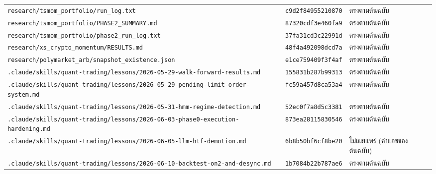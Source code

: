 {\begin{longtable}{@{}>{\raggedright\arraybackslash}p{8.6cm}p{2.7cm}>{\raggedright\arraybackslash}p{3.4cm}@{}}
\texttt{research/\allowbreak{}tsmom\_portfolio/\allowbreak{}run\_log.txt} & \texttt{c9d2f84955210870} & ตรงตามต้นฉบับ \\
\texttt{research/\allowbreak{}tsmom\_portfolio/\allowbreak{}PHASE2\_SUMMARY.md} & \texttt{87320cdf3e460fa9} & ตรงตามต้นฉบับ \\
\texttt{research/\allowbreak{}tsmom\_portfolio/\allowbreak{}phase2\_run\_log.txt} & \texttt{37fa31cd3c22991d} & ตรงตามต้นฉบับ \\
\texttt{research/\allowbreak{}xs\_crypto\_momentum/\allowbreak{}RESULTS.md} & \texttt{48f4a492098dcd7a} & ตรงตามต้นฉบับ \\
\texttt{research/\allowbreak{}polymarket\_arb/\allowbreak{}snapshot\_existence.json} & \texttt{e1ce759409f3f4af} & ตรงตามต้นฉบับ \\
\texttt{.claude/\allowbreak{}skills/\allowbreak{}quant-\allowbreak{}trading/\allowbreak{}lessons/\allowbreak{}2026-\allowbreak{}05-\allowbreak{}29-\allowbreak{}walk-\allowbreak{}forward-\allowbreak{}results.md} & \texttt{155831b287b99313} & ตรงตามต้นฉบับ \\
\texttt{.claude/\allowbreak{}skills/\allowbreak{}quant-\allowbreak{}trading/\allowbreak{}lessons/\allowbreak{}2026-\allowbreak{}05-\allowbreak{}29-\allowbreak{}pending-\allowbreak{}limit-\allowbreak{}order-\allowbreak{}system.md} & \texttt{fc59a457d8ca53a4} & ตรงตามต้นฉบับ \\
\texttt{.claude/\allowbreak{}skills/\allowbreak{}quant-\allowbreak{}trading/\allowbreak{}lessons/\allowbreak{}2026-\allowbreak{}05-\allowbreak{}31-\allowbreak{}hmm-\allowbreak{}regime-\allowbreak{}detection.md} & \texttt{52ec0f7a8d5c3381} & ตรงตามต้นฉบับ \\
\texttt{.claude/\allowbreak{}skills/\allowbreak{}quant-\allowbreak{}trading/\allowbreak{}lessons/\allowbreak{}2026-\allowbreak{}06-\allowbreak{}03-\allowbreak{}phase0-\allowbreak{}execution-\allowbreak{}hardening.md} & \texttt{873ea28115830546} & ตรงตามต้นฉบับ \\
\texttt{.claude/\allowbreak{}skills/\allowbreak{}quant-\allowbreak{}trading/\allowbreak{}lessons/\allowbreak{}2026-\allowbreak{}06-\allowbreak{}05-\allowbreak{}llm-\allowbreak{}htf-\allowbreak{}demotion.md} & \texttt{6b8b50bf6cf8be20} & ไม่เผยแพร่ (ค่าแฮชของต้นฉบับ) \\
\texttt{.claude/\allowbreak{}skills/\allowbreak{}quant-\allowbreak{}trading/\allowbreak{}lessons/\allowbreak{}2026-\allowbreak{}06-\allowbreak{}10-\allowbreak{}backtest-\allowbreak{}on2-\allowbreak{}and-\allowbreak{}desync.md} & \texttt{1b7084b22b787ae6} & ตรงตามต้นฉบับ \\

\end{longtable}}
